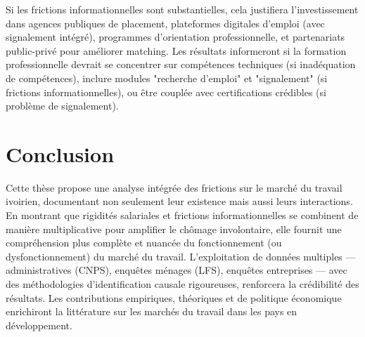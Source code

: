 \documentclass[12pt,a4paper]{article}
\begin{document}
Si les frictions informationnelles sont substantielles, cela justifiera l'investissement dans agences publiques de placement, plateformes digitales d'emploi (avec signalement intégré), programmes d'orientation professionnelle, et partenariats public-privé pour améliorer matching. Les résultats informeront si la formation professionnelle devrait se concentrer sur compétences techniques (si inadéquation de compétences), inclure modules "recherche d'emploi" et "signalement" (si frictions informationnelles), ou être couplée avec certifications crédibles (si problème de signalement).

\section{Conclusion}

Cette thèse propose une analyse intégrée des frictions sur le marché du travail ivoirien, documentant non seulement leur existence mais aussi leurs interactions. En montrant que rigidités salariales et frictions informationnelles se combinent de manière multiplicative pour amplifier le chômage involontaire, elle fournit une compréhension plus complète et nuancée du fonctionnement (ou dysfonctionnement) du marché du travail. L'exploitation de données multiples — administratives (CNPS), enquêtes ménages (LFS), enquêtes entreprises — avec des méthodologies d'identification causale rigoureuses, renforcera la crédibilité des résultats. Les contributions empiriques, théoriques et de politique économique enrichiront la littérature sur les marchés du travail dans les pays en développement.
\end{document}

